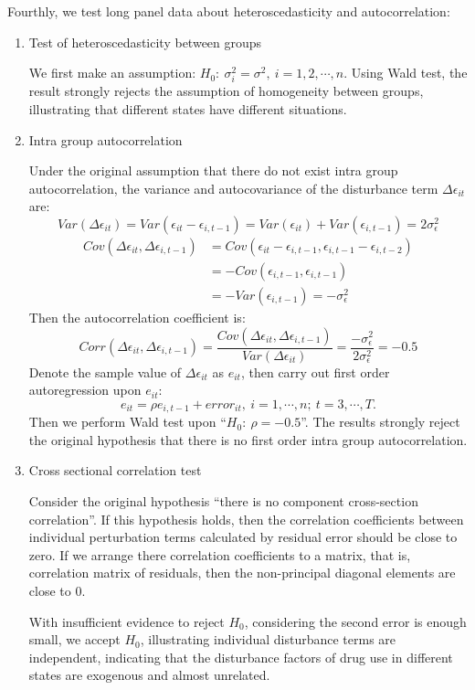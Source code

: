 \documentclass{mcmthesis}
\numberwithin{equation}{section}
\numberwithin{figure}{section}
\numberwithin{table}{section}
\theoremstyle{mydef}
\begin{document}
Fourthly, we test long panel data about heteroscedasticity and autocorrelation:
\begin{enumerate}[]
\item Test of heteroscedasticity between groups

We first make an assumption: $H_0:\ \sigma_i^2=\sigma^2,\ i=1,2,\cdots,n.$
Using Wald test\cite{b9}, the result strongly rejects the assumption of homogeneity between groups, illustrating that different states have different situations.
\item Intra group autocorrelation

Under the original assumption that there do not exist intra group autocorrelation, the variance and autocovariance of the disturbance term $\Delta\epsilon_{it}$ are:
\begin{equation}
Var(\Delta\epsilon_{it})=Var(\epsilon_{it}-\epsilon_{i,t-1})
=Var(\epsilon_{it}) + Var(\epsilon_{i,t-1}) = 2\sigma_\epsilon^2
\end{equation}
\begin{equation}
\begin{aligned}
Cov(\Delta\epsilon_{it},\Delta\epsilon_{i,t-1})
&=Cov(\epsilon_{it}-\epsilon_{i,t-1},\epsilon_{i,t-1}-\epsilon_{i,t-2})\\
&=-Cov(\epsilon_{i,t-1},\epsilon_{i,t-1})\\
&=-Var(\epsilon_{i,t-1})=-\sigma_\epsilon^2
\end{aligned}
\end{equation}
Then the autocorrelation coefficient is:
\begin{equation}
Corr(\Delta\epsilon_{it},\Delta\epsilon_{i,t-1})
=\frac{Cov(\Delta\epsilon_{it},\Delta\epsilon_{i,t-1})}
{Var(\Delta\epsilon_{it})}
=\frac{-\sigma_\epsilon^2}{2\sigma_\epsilon^2}
=-0.5
\end{equation}
Denote the sample value of $\Delta\epsilon_{it}$ as $e_{it}$, then carry out first order autoregression upon $e_{it}$:
\begin{equation}
e_{it}=\rho e_{i,t-1}+error_{it}, \ i=1,\cdots,n;\ t=3,\cdots,T.
\end{equation}
Then we perform Wald test upon ``$H_0:\ \rho=-0.5$''. The results strongly reject the original hypothesis that there is no first order intra group autocorrelation.
\item Cross sectional correlation test

Consider the original hypothesis ``there is no component cross-section correlation''. If this hypothesis holds, then the correlation coefficients between individual perturbation terms calculated by residual error should be close to zero. If we arrange there correlation coefficients to a matrix, that is, correlation matrix of residuals, then the non-principal diagonal elements are close to 0.

With insufficient evidence to reject $H_0$, considering the second error is enough small, we accept $H_0$, illustrating individual disturbance terms are independent, indicating that the disturbance factors of drug use in different states are exogenous and almost unrelated.
\end{enumerate}
\end{document}
